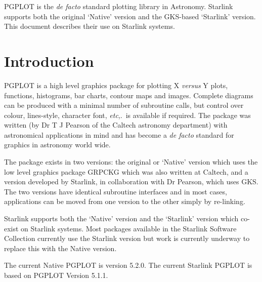 \documentclass[twoside,11pt]{article}
\newcommand{\stardocinitials}  {SUN}
\newcommand{\stardocnumber}    {15.8}
\newcommand{\stardocabstract}  {PGPLOT is the \emph{de facto} standard plotting
library in Astronomy.  Starlink supports both the original `Native' version and the GKS-based `Starlink' version.  This document describes their use on 
Starlink systems.}
\newcommand{\stardocname}{\stardocinitials /\stardocnumber}
\newenvironment{latexonly}{}{}
\newcommand{\xlabel}[1]{}
\renewcommand{\_}{\texttt{\symbol{95}}}
\renewcommand{\thepage}{\roman{page}}
\begin{document}
\stardocabstract
  \newpage
  \begin{latexonly}
    \setlength{\parskip}{0mm}
    \tableofcontents
    \setlength{\parskip}{\medskipamount}
    \markboth{\stardocname}{\stardocname}
  \end{latexonly}
\cleardoublepage
\renewcommand{\thepage}{\arabic{page}}
\setcounter{page}{1}


\section{\xlabel{introduction}Introduction}
\label{introduction}

PGPLOT is a high level graphics package for plotting X \emph{versus} Y
plots, functions, histograms, bar charts, contour maps and images.
Complete diagrams can be produced with a minimal number of subroutine
calls, but control over colour, lines-style, character font,
\emph{etc},.\ is available if required.  The package was written (by Dr
T J Pearson of the Caltech astronomy department) with astronomical
applications in mind and has become a \textit{de facto} standard for
graphics in astronomy world wide.

The package exists in two versions: the original or `Native' version
which uses the low level graphics package GRPCKG which was also
written at Caltech, and a version developed by Starlink, in
collaboration with Dr Pearson, which uses GKS.  The two versions have
identical subroutine interfaces and in most cases, applications can be 
moved from one version to the other simply by re-linking.

Starlink supports both the `Native' version and the `Starlink' version
which co-exist on Starlink systems.  Most packages available in the
Starlink Software Collection currently use the Starlink version but
work is currently underway to replace this with the Native version.

The current Native PGPLOT is version 5.2.0.
The current Starlink PGPLOT is based on PGPLOT Version 5.1.1.
\end{document}
